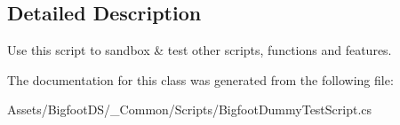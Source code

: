 \subsection{Detailed Description}
Use this script to sandbox \& test other scripts, functions and features. 



The documentation for this class was generated from the following file\+:\begin{DoxyCompactItemize}
\item 
Assets/\+Bigfoot\+D\+S/\+\_\+\+Common/\+Scripts/Bigfoot\+Dummy\+Test\+Script.\+cs\end{DoxyCompactItemize}
